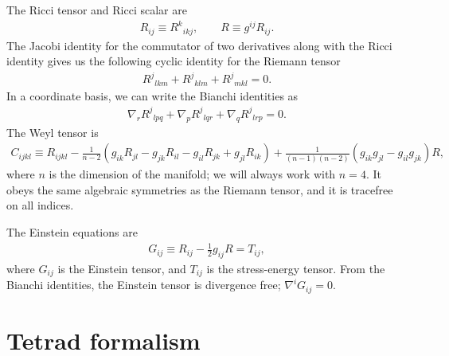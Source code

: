 \documentclass[12pt]{report}
\begin{document}
The Ricci tensor and Ricci scalar are
\begin{align}
	R_{ij} \equiv R^k{}_{ikj} 
	,
	\qquad
	R \equiv g^{ij}R_{ij}
	.
\end{align}
	The Jacobi identity for the commutator of two derivatives
along with the Ricci identity
gives us the following cyclic identity for the Riemann tensor 
\begin{align}
\label{eq:Riemann_cyclic_identity}
	R^j{}_{lkm}
+	R^j{}_{klm}
+	R^j{}_{mkl}
	=
	0
	.
\end{align} 
	In a coordinate basis, we can write the Bianchi identities as
\begin{align}
\label{eq:Riemann_Bianchi_identity}
	\nabla_rR^j{}_{lpq}
+	\nabla_pR^j{}_{lqr}
+	\nabla_qR^j{}_{lrp}
	=
	0
	.
\end{align}
	The Weyl tensor is
\begin{align}
\label{eq:def_Weyl_tensor}
	C_{ijkl}
	\equiv
	R_{ijkl}
-	\frac{1}{n-2}\left(
		g_{ik}R_{jl}
	-	g_{jk}R_{il}
	-	g_{il}R_{jk}
	+	g_{jl}R_{ik}
	\right)
+	\frac{1}{(n-1)(n-2)}\left(
		g_{ik}g_{jl}
	-	g_{il}g_{jk}
	\right)R
	,
\end{align}
	where $n$ is the dimension of the manifold; we will always work
with $n=4$.
It obeys the same algebraic symmetries as the Riemann tensor, and it is
tracefree on all indices.

	The Einstein equations are
\begin{align}
	G_{ij}\equiv R_{ij}-\frac{1}{2}g_{ij}R
	=
	T_{ij}
	,
\end{align}
	where $G_{ij}$ is the Einstein tensor, and $T_{ij}$ is
the stress-energy tensor. From the Bianchi identities, the Einstein
tensor is divergence free; $\nabla^iG_{ij}=0$.
\section{Tetrad formalism}
\label{sec:tetrad_formalism}
\end{document}
